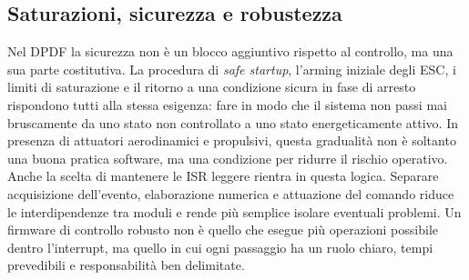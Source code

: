 \documentclass[11pt]{report}
\begin{document}
	\subsection{Saturazioni, sicurezza e robustezza}
	Nel DPDF la sicurezza non è un blocco aggiuntivo rispetto al controllo, ma una sua parte costitutiva. La procedura di \textit{safe startup}, l'arming iniziale degli ESC, i limiti di saturazione e il ritorno a una condizione sicura in fase di arresto rispondono tutti alla stessa esigenza: fare in modo che il sistema non passi mai bruscamente da uno stato non controllato a uno stato energeticamente attivo. In presenza di attuatori aerodinamici e propulsivi, questa gradualità non è soltanto una buona pratica software, ma una condizione per ridurre il rischio operativo.\\
	Anche la scelta di mantenere le ISR leggere rientra in questa logica. Separare acquisizione dell'evento, elaborazione numerica e attuazione del comando riduce le interdipendenze tra moduli e rende più semplice isolare eventuali problemi. Un firmware di controllo robusto non è quello che esegue più operazioni possibile dentro l'interrupt, ma quello in cui ogni passaggio ha un ruolo chiaro, tempi prevedibili e responsabilità ben delimitate.
	
	
\end{document}
